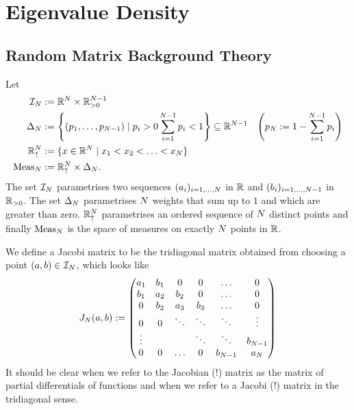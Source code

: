 
\section{Eigenvalue Density}

\subsection{Random Matrix Background Theory}

\begin{definition}[Spaces]
    Let 
    \begin{align*}
        \mathcal{I}_N & := \mathbb{R}^N\times\mathbb{R}^{N-1}_{>0} \\
        \Delta_N & := \left\{ (p_1, \ldots, p_{N-1}) \mid p_i > 0 \sum_{i=1}^{N-1}p_i < 1 \right\} \subseteq \mathbb{R}^{N-1} & \left( p_N := 1-\sum_{i=1}^{N-1} p_i \right) \\
        \mathbb{R}_{\uparrow}^N & := \{ x\in\mathbb{R}^N \mid x_1 < x_2 < \ldots < x_N \} \\
        \operatorname{Meas}_N & := \mathbb{R}_{\uparrow}^N \times \Delta_N.
    \end{align*}
    The set $\mathcal{I}_N$ parametrises two sequences $(a_i)_{i=1,\ldots,N}$ in $\mathbb{R}$ and $(b_i)_{i=1,\ldots,N-1}$ in $\mathbb{R}_{>0}$. The set $\Delta_N$ parametrises $N$ weights that sum up to $1$ and which are greater than zero. $\mathbb{R}_{\uparrow}^N$ parametrises an ordered sequence of $N$ distinct points and finally $\operatorname{Meas}_N$ is the space of measures on exactly $N$ points in $\mathbb{R}$.
\end{definition}

\begin{definition}
    We define a Jacobi matrix to be the tridiagonal matrix obtained from choosing a point $(a,b) \in \mathcal{I}_N$, which looks like
    \begin{align*}
        J_N(a,b) :=
        \begin{pmatrix}
            a_1    & b_1 & 0      & 0      & \ldots           & 0                \\
            b_1    & a_2 & b_2    & 0      & \ldots           & 0                \\
            0      & b_2 & a_3    & b_3    & \ldots           & 0                \\
            0      & 0   & \ddots & \ddots & \ddots           & \vdots           \\
            \vdots &     &        & \ddots & \ddots           & b_{N-1} \\
            0      &  0  & \ldots & 0      & b_{N-1} & a_{N}   
        \end{pmatrix}
    \end{align*}
    It should be clear when we refer to the Jacobian (!) matrix as the matrix of partial differentials of functions and when we refer to a Jacobi (!) matrix in the tridiagonal sense.
\end{definition}

